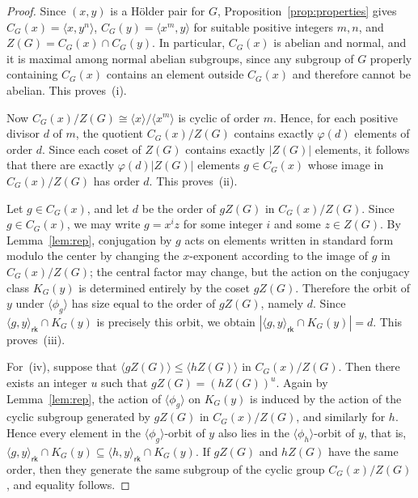 \documentclass[a4paper,12pt]{article}
\theoremstyle{definition}
\theoremstyle{remark}
\begin{document}
\begin{proof}
  Since $(x,y)$ is a Hölder pair for $G$, Proposition~\ref{prop:properties} gives $C_G(x)=\langle x,y^n\rangle$,\; $C_G(y)=\langle x^m,y\rangle$ for suitable positive integers $m,n$, and $Z(G)=C_G(x)\cap C_G(y)$. In particular, $C_G(x)$ is abelian and normal, and it is maximal among normal abelian subgroups, since any subgroup of $G$ properly containing $C_G(x)$ contains an element outside $C_G(x)$ and therefore cannot be abelian. This proves~(i).

  Now $C_G(x)/Z(G)\cong \langle x\rangle/\langle x^m\rangle$ is cyclic of order $m$. Hence, for each positive divisor $d$ of $m$, the quotient $C_G(x)/Z(G)$ contains exactly $\varphi(d)$ elements of order $d$. Since each coset of $Z(G)$ contains exactly $|Z(G)|$ elements, it follows that there are exactly $\varphi(d)|Z(G)|$ elements $g\in C_G(x)$ whose image in $C_G(x)/Z(G)$ has order $d$. This proves~(ii).

  Let $g\in C_G(x)$, and let $d$ be the order of $gZ(G)$ in $C_G(x)/Z(G)$. Since $g\in C_G(x)$, we may write $g=x^iz$ for some integer $i$ and some $z\in Z(G)$. By Lemma~\ref{lem:rep}, conjugation by $g$ acts on elements written in standard form modulo the center by changing the $x$-exponent according to the image of $g$ in $C_G(x)/Z(G)$; the central factor may change, but the action on the conjugacy class $K_G(y)$ is determined entirely by the coset $gZ(G)$. Therefore the orbit of $y$ under $\langle \phi_g\rangle$ has size equal to the order of $gZ(G)$, namely $d$. Since $\langle g,y\rangle_{\mathsf{rk}}\cap K_G(y)$ is precisely this orbit, we obtain $|\langle g,y\rangle_{\mathsf{rk}}\cap K_G(y)|=d$. This proves~(iii).

  For~(iv), suppose that $\langle gZ(G)\rangle\leq \langle hZ(G)\rangle$ in $C_G(x)/Z(G)$. Then there exists an integer $u$ such that $gZ(G)=(hZ(G))^u$. Again by Lemma~\ref{lem:rep}, the action of $\langle \phi_g\rangle$ on $K_G(y)$ is induced by the action of the cyclic subgroup generated by $gZ(G)$ in $C_G(x)/Z(G)$, and similarly for $h$. Hence every element in the $\langle \phi_g\rangle$-orbit of $y$ also lies in the $\langle \phi_h\rangle$-orbit of $y$, that is, $\langle g,y\rangle_{\mathsf{rk}}\cap K_G(y)\subseteq \langle h,y\rangle_{\mathsf{rk}}\cap K_G(y)$. If $gZ(G)$ and $hZ(G)$ have the same order, then they generate the same subgroup of the cyclic group $C_G(x)/Z(G)$, and equality follows.
\end{proof}
\end{document}
